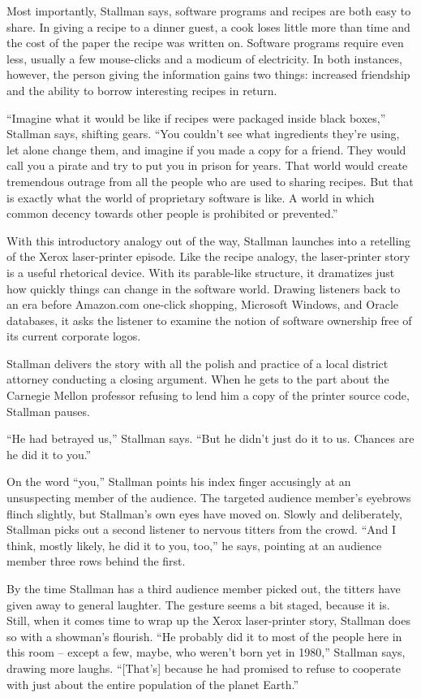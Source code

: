 Most importantly, Stallman says, software programs and recipes are both easy to share. In giving a recipe to a dinner guest, a cook loses little more than time and the cost of the paper the recipe was written on. Software programs require even less, usually a few mouse-clicks and a modicum of electricity. In both instances, however, the person giving the information gains two things: increased friendship and the ability to borrow interesting recipes in return.

``Imagine what it would be like if recipes were packaged inside black boxes,'' Stallman says, shifting gears. ``You couldn't see what ingredients they're using, let alone change them, and imagine if you made a copy for a friend. They would call you a pirate and try to put you in prison for years. That world would create tremendous outrage from all the people who are used to sharing recipes. But that is exactly what the world of proprietary software is like. A world in which common decency towards other people is prohibited or prevented.''

With this introductory analogy out of the way, Stallman launches into a retelling of the Xerox laser-printer episode. Like the recipe analogy, the laser-printer story is a useful rhetorical device. With its parable-like structure, it dramatizes just how quickly things can change in the software world. Drawing listeners back to an era before Amazon.com one-click shopping, Microsoft Windows, and Oracle databases, it asks the listener to examine the notion of software ownership free of its current corporate logos.

Stallman delivers the story with all the polish and practice of a local district attorney conducting a closing argument. When he gets to the part about the Carnegie Mellon professor refusing to lend him a copy of the printer source code, Stallman pauses.

``He had betrayed us,'' Stallman says. ``But he didn't just do it to us. Chances are he did it to you.''

On the word ``you,'' Stallman points his index finger accusingly at an unsuspecting member of the audience. The targeted audience member's eyebrows flinch slightly, but Stallman's own eyes have moved on. Slowly and deliberately, Stallman picks out a second listener to nervous titters from the crowd. ``And I think, mostly likely, he did it to you, too,'' he says, pointing at an audience member three rows behind the first.

By the time Stallman has a third audience member picked out, the titters have given away to general laughter. The gesture seems a bit staged, because it is. Still, when it comes time to wrap up the Xerox laser-printer story, Stallman does so with a showman's flourish. ``He probably did it to most of the people here in this room -- except a few, maybe, who weren't born yet in 1980,'' Stallman says, drawing more laughs. ``[That's] because he had promised to refuse to cooperate with just about the entire population of the planet Earth.''

